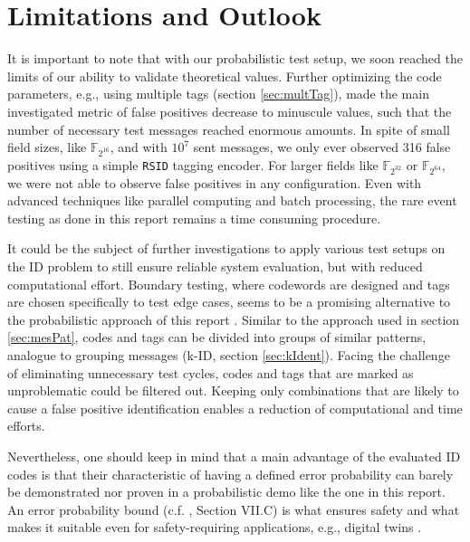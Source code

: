 \documentclass[english,BCOR=4mm,cdfont=false]{tudscrreprt} %
\begin{document}
    
\section{Limitations and Outlook}
\label{sec:outlook}
It is important to note that with our probabilistic test setup, we soon reached the limits of our ability to validate theoretical values. Further optimizing the code parameters, e.g., using multiple tags (section \ref{sec:multTag}), made the main investigated metric of false positives decrease to minuscule values, such that the number of necessary test messages reached enormous amounts. In spite of small field sizes, like $\mathbb{F}_{2^{16}}$, and with $10^7$ sent messages, we only ever observed 316 false positives using a simple \texttt{RSID} tagging encoder. For larger fields like $\mathbb{F}_{2^{32}}$ or $\mathbb{F}_{2^{64}}$, we were not able to observe false positives in any configuration. Even with advanced techniques like parallel computing and batch processing, the rare event testing as done in this report remains a time consuming procedure.

It could be the subject of further investigations to apply various test setups on the ID problem to still ensure reliable system evaluation, but with reduced computational effort.
Boundary testing, where codewords are designed and tags are chosen specifically to test edge cases, seems to be a promising alternative to the probabilistic approach of this report \cite{dobslaw2020boundary}. Similar to the approach used in section \ref{sec:mesPat}, codes and tags can be divided into groups of similar patterns, analogue to grouping messages (k-ID, section \ref{sec:kIdent}). Facing the challenge of eliminating unnecessary test cycles, codes and tags that are marked as unproblematic could be filtered out. Keeping only combinations that are likely to cause a false positive identification enables a reduction of computational and time efforts.   

Nevertheless, one should keep in mind that a main advantage of the evaluated ID codes is that their characteristic of having a defined error probability can barely be demonstrated nor proven in a probabilistic demo like the one in this report. An error probability bound (c.f. \cite{Codes_for_ID_Tutorial}, Section VII.C) is what ensures safety and what makes it suitable even for safety-requiring applications, e.g., digital twins \cite{von_lengerke_identification_2023}. 


\vspace{1cm}
\end{document}

